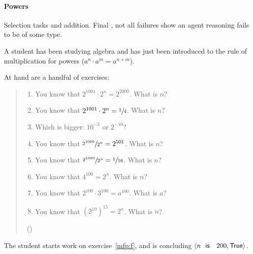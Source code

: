 \paragraph*{Powers}

\begin{note}
  Selection tasks and addition.
  Final , not all failures show an agent reasoning fails to be of some type.
\end{note}

\begin{note}
  \begin{scenario}
    \label{illu:tR:powers}
    A student has been studying algebra and has just been introduced to the rule of multiplication for powers (\(a^{n} \cdot a^{m} = a^{n + m}\)).

    At hand are a handful of exercises:

    \begin{quote}
      \begin{enumerate}[label=(\alph*), ref=(\alph*)]
      \item
        \label{mfp:a}
        You know that \(2^{1001} \cdot 2^{n} = 2^{2000}\).
        What is \(n\)?
      \item
        \label{mfp:b}
        You know that \(2^{1001} \cdot 2^{n} = \sfrac{1}{4}\).
        What is \(n\)?
      \item
        \label{mfp:c}
        Which is bigger: \(10^{-3}\) or \(2^{-10}\)?
      \item
        \label{mfp:d}
        You know that \(\sfrac{2^{1000}}{2^{n}} = 2^{501}\).
        What is \(n\)?
      \item
        \label{mfp:e}
        You know that \(\sfrac{2^{1000}}{2^{n}} = \sfrac{1}{16}\).
        What is \(n\)?
      \item
        \label{mfp:f}
        You know that \(4^{100} = 2^{n}\).
        What is \(n\)?
      \item
        \label{mfp:g}
        You know that \(2^{100} \cdot 3^{100} = a^{100}\).
        What is \(a\)?
      \item
        \label{mfp:h}
        You know that \((2^{10})^{15} = 2^{n}\).
        What is \(n\)?
      \end{enumerate}
      \mbox{ }\hfill\mbox{(\cite[32]{Gelfand:1993aa})}
    \end{quote}

    The student starts work on exercise~\ref{mfp:f}, and is concluding \(\pv{n\propI{ is }200}{\valI{True}}\).
  \end{scenario}


\end{note}
